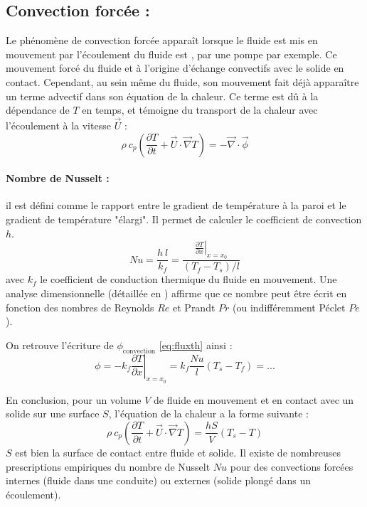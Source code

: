\subsection{Convection forcée :}
Le phénomène de convection forcée apparaît lorsque le fluide est mis en mouvement par
l'écoulement du fluide est , par une pompe par exemple. Ce mouvement forcé du fluide et à l'origine d'échange convectifs avec le solide en contact. Cependant, au sein même du fluide, son mouvement fait déjà apparaître un terme advectif dans son équation de la chaleur. Ce terme est dû à la dépendance de $T$ en temps, et témoigne du transport de la chaleur avec l'écoulement à la vitesse $\vec{U}$ :
%
\begin{equation}
    \rho~c_{p} \left( \frac{\partial T}{\partial t}
    + \vec{U} \cdot \vec{\nabla} T \right)
    = - \vec{\nabla} \cdot \vec{\phi}
\end{equation}

\paragraph{Nombre de Nusselt :}il est défini comme le rapport entre le gradient de température à la paroi et le gradient de température "élargi". Il permet de calculer le coefficient de convection $h$.
%
\begin{equation}
    Nu = \frac{h~l}{k_f}
       = \frac{\left. \frac{\partial{T}}{\partial{x}} \right|_{x=x_0}}
              {\left( T_f - T_s \right)/l}
\end{equation}
%
avec $k_f$ le coefficient de conduction thermique du fluide en mouvement. Une analyse dimensionnelle (détaillée en \cite{battaglia2010introduction}) affirme que ce nombre peut être écrit en fonction des nombres de Reynolds $Re$ et Prandt $Pr$ (ou indifféremment Péclet $Pe$).

On retrouve l'écriture de $\phi_{\text{convection}}$ \eqref{eq:fluxth} ainsi :
%
\begin{equation}
    \phi = - k_f \left. \frac{\partial{T}}{\partial{x}} \right|_{x=x_0}
         = k_f \frac{Nu}{l} \left( T_s - T_f \right)
         = ...
\end{equation}

En conclusion, pour un volume $V$ de fluide en mouvement et en contact avec un solide sur une surface $S$, l'équation de la chaleur a la forme suivante :
%
\begin{equation}
    \rho~c_p \left( \frac{\partial T}{\partial t}
    + \vec{U} \cdot \vec{\nabla} T \right)
    = \frac{h S}{V} \left( T_s - T \right)
\end{equation}
%
$S$ est bien la surface de contact entre fluide et solide. Il existe de nombreuses prescriptions empiriques du nombre de Nusselt $Nu$ pour des convections forcées internes (fluide dans une conduite) ou externes (solide plongé dans un écoulement).


